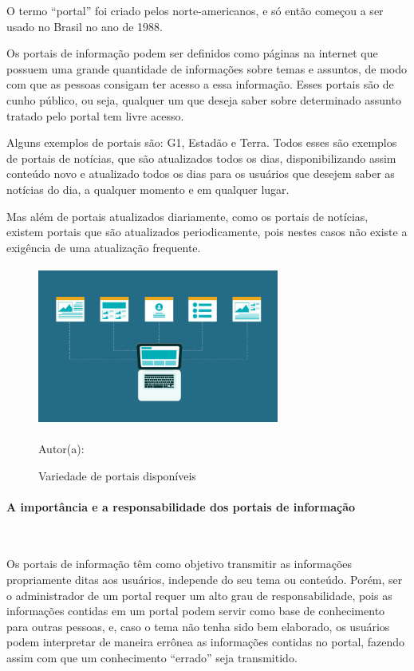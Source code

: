 O termo “portal” foi criado pelos norte-americanos, e só então começou a ser usado no Brasil no ano de 1988.

Os portais de informação podem ser definidos como páginas na internet que possuem uma grande quantidade de informações sobre temas e assuntos, de modo com que as pessoas consigam ter acesso a essa informação. Esses portais são de cunho público, ou seja, qualquer um que deseja saber sobre determinado assunto tratado pelo portal tem livre acesso.

Alguns exemplos de portais são: G1, Estadão e Terra. Todos esses são exemplos de portais de notícias, que são atualizados todos os dias, disponibilizando assim conteúdo novo e atualizado todos os dias para os usuários que desejem saber as notícias do dia, a qualquer momento e em qualquer lugar.

Mas além de portais atualizados diariamente, como os portais de notícias, existem portais que são atualizados periodicamente, pois nestes casos não existe a exigência de uma atualização frequente.
 \begin{figure}[!h]
	\centering
	\caption{Variedade de portais disponíveis}
	\includegraphics[width=300px, height=200px]{./images/2-3.jpg}
		\par{Autor(a): \cite{loba}}
\end{figure}
\newpage

\paragraph{A importância e a responsabilidade dos portais de informação}\mbox{}\\
\par
Os portais de informação têm como objetivo transmitir as informações propriamente ditas aos usuários, independe do seu tema ou conteúdo. Porém, ser o administrador de um portal requer um alto grau de responsabilidade, pois as informações contidas em um portal podem servir como base de conhecimento para outras pessoas, e, caso o tema não tenha sido bem elaborado, os usuários podem interpretar de maneira errônea as informações contidas no portal, fazendo assim com que um conhecimento “errado” seja transmitido.

